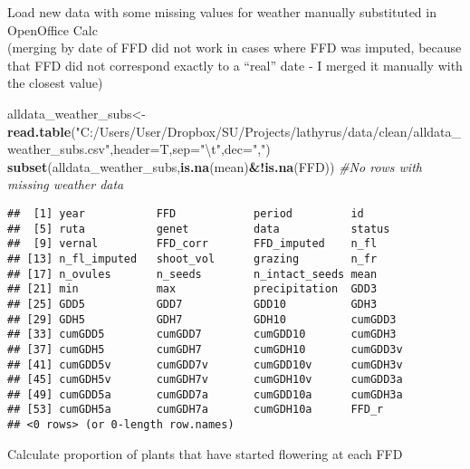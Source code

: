 \documentclass[10pt,]{article}
\newenvironment{Shaded}{\begin{snugshade}}{\end{snugshade}}
\newcommand{\KeywordTok}[1]{\textcolor[rgb]{0.13,0.29,0.53}{\textbf{#1}}}
\newcommand{\DataTypeTok}[1]{\textcolor[rgb]{0.13,0.29,0.53}{#1}}
\newcommand{\CharTok}[1]{\textcolor[rgb]{0.31,0.60,0.02}{#1}}
\newcommand{\StringTok}[1]{\textcolor[rgb]{0.31,0.60,0.02}{#1}}
\newcommand{\CommentTok}[1]{\textcolor[rgb]{0.56,0.35,0.01}{\textit{#1}}}
\newcommand{\OperatorTok}[1]{\textcolor[rgb]{0.81,0.36,0.00}{\textbf{#1}}}
\newcommand{\NormalTok}[1]{#1}
\begin{document}
Load new data with some missing values for weather manually substituted
in OpenOffice Calc\\
(merging by date of FFD did not work in cases where FFD was imputed,
because that FFD did not correspond exactly to a ``real'' date - I
merged it manually with the closest value)

\begin{Shaded}
\begin{Highlighting}[]
\NormalTok{alldata_weather_subs<-}\KeywordTok{read.table}\NormalTok{(}\StringTok{"C:/Users/User/Dropbox/SU/Projects/lathyrus/data/clean/alldata_weather_subs.csv"}\NormalTok{,}\DataTypeTok{header=}\NormalTok{T,}\DataTypeTok{sep=}\StringTok{"}\CharTok{\textbackslash{}t}\StringTok{"}\NormalTok{,}\DataTypeTok{dec=}\StringTok{","}\NormalTok{) }
\KeywordTok{subset}\NormalTok{(alldata_weather_subs,}\KeywordTok{is.na}\NormalTok{(mean)}\OperatorTok{&!}\KeywordTok{is.na}\NormalTok{(FFD)) }\CommentTok{#No rows with missing weather data}
\end{Highlighting}
\end{Shaded}

\begin{verbatim}
##  [1] year           FFD            period         id            
##  [5] ruta           genet          data           status        
##  [9] vernal         FFD_corr       FFD_imputed    n_fl          
## [13] n_fl_imputed   shoot_vol      grazing        n_fr          
## [17] n_ovules       n_seeds        n_intact_seeds mean          
## [21] min            max            precipitation  GDD3          
## [25] GDD5           GDD7           GDD10          GDH3          
## [29] GDH5           GDH7           GDH10          cumGDD3       
## [33] cumGDD5        cumGDD7        cumGDD10       cumGDH3       
## [37] cumGDH5        cumGDH7        cumGDH10       cumGDD3v      
## [41] cumGDD5v       cumGDD7v       cumGDD10v      cumGDH3v      
## [45] cumGDH5v       cumGDH7v       cumGDH10v      cumGDD3a      
## [49] cumGDD5a       cumGDD7a       cumGDD10a      cumGDH3a      
## [53] cumGDH5a       cumGDH7a       cumGDH10a      FFD_r         
## <0 rows> (or 0-length row.names)
\end{verbatim}

Calculate proportion of plants that have started flowering at each FFD
\end{document}
